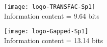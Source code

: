 \texttt{[image: logo-TRANSFAC-Sp1]} \\
Information content = 9.64 bits


\texttt{[image: logo-Gapped-Sp1]} \\
Information content = 13.14 bits


